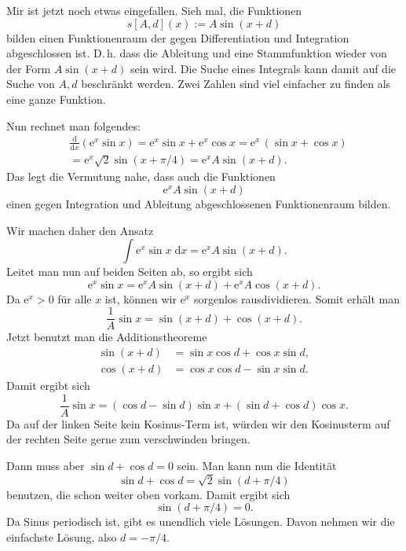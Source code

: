 \documentclass[a4paper,10pt,fleqn,twoside]{scrartcl}
\numberwithin{equation}{section}
\newcommand{\ee}{\mathrm e}
\theoremstyle{Aufgabe}
\begin{document}
Mir ist jetzt noch etwas eingefallen.
Sieh mal, die Funktionen
\begin{equation}
s[A,d](x):=A\sin(x+d)
\end{equation}
bilden einen Funktionenraum
der gegen Differentiation und Integration abgeschlossen ist. D.\,h.
dass die Ableitung und eine Stammfunktion wieder
von der Form $A\sin(x+d)$ sein wird. Die Suche eines Integrals
kann damit auf die Suche von $A,d$ beschränkt werden. Zwei Zahlen
sind viel einfacher zu finden als eine ganze Funktion.

Nun rechnet man folgendes:
\begin{align}
&\frac{\mathrm d}{\mathrm dx}(\ee^x\sin x)
= \ee^x\sin x+\ee^x\cos x = \ee^x\,(\sin x+\cos x)\\
&= \ee^x \sqrt{2}\sin(x+\pi/4)
= \ee^x A\sin(x+d).
\end{align}
Das legt die Vermutung nahe, dass auch die Funktionen
\begin{equation}
\ee^x A\sin(x+d)
\end{equation}
einen gegen Integration und Ableitung abgeschlossenen
Funktionenraum bilden.

Wir machen daher den Ansatz
\begin{equation}
\int \ee^x\sin x\;\mathrm dx = \ee^x A\sin(x+d).
\end{equation}
Leitet man nun auf beiden Seiten ab, so ergibt sich
\begin{equation}
\ee^x\sin x = \ee^x A\sin(x+d)+\ee^x A\cos(x+d).
\end{equation}
Da $\ee^x>0$ für alle $x$ ist, können wir $\ee^x$ sorgenlos
rausdividieren. Somit erhält man
\begin{equation}
\frac{1}{A}\sin x = \sin(x+d)+\cos(x+d).
\end{equation}
Jetzt benutzt man die Additionstheoreme
\begin{align}
\sin(x+d) &= \sin x\cos d + \cos x\sin d,\\
\cos(x+d) &= \cos x\cos d - \sin x\sin d.
\end{align}
Damit ergibt sich
\begin{equation}
\frac{1}{A}\sin x = (\cos d-\sin d)\sin x+(\sin d+\cos d)\cos x.
\end{equation}
Da auf der linken Seite kein Kosinus-Term ist, würden wir den
Kosinusterm auf der rechten Seite gerne zum verschwinden bringen.

Dann muss aber $\sin d+\cos d=0$ sein.
Man kann nun die Identität
\begin{equation}
\sin d+\cos d=\sqrt{2}\sin(d+\pi/4)
\end{equation}
benutzen, die schon weiter oben vorkam. Damit ergibt sich
\begin{equation}
\sin(d+\pi/4)=0.
\end{equation}
Da Sinus periodisch ist, gibt es unendlich viele Lösungen. Davon
nehmen wir die einfachste Lösung, also $d=-\pi/4$.
\end{document}
